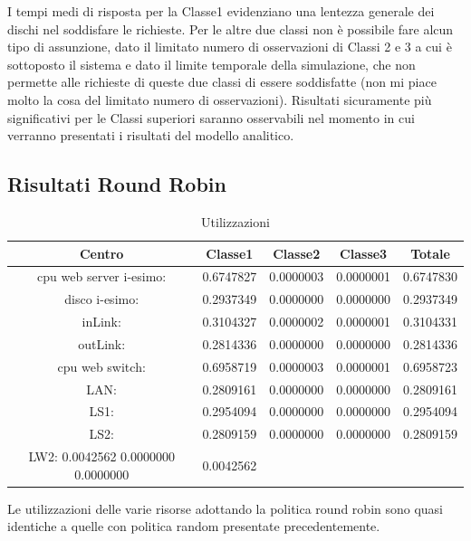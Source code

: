 I tempi medi di risposta per la Classe1 evidenziano una lentezza generale dei dischi nel soddisfare le richieste. Per le altre due classi non è possibile fare alcun tipo di assunzione, dato il limitato numero di osservazioni di Classi 2 e 3 a cui è sottoposto il sistema e dato il limite temporale della simulazione, che non permette alle richieste di queste due classi di essere soddisfatte (non mi piace molto la cosa del limitato numero di osservazioni). Risultati sicuramente più significativi per le Classi superiori saranno osservabili nel momento in cui verranno presentati i risultati del modello analitico.

\subsection{Risultati Round Robin}
\begin{table}[htbp]
\begin{center}
\begin{tabular}{|c|c|c|c|c|}
\hline
Centro &Classe1 &Classe2 &Classe3 &Totale\\
\hline
\hline
 cpu web server i-esimo: 	&0.6747827	&0.0000003	&0.0000001	&0.6747830\\
\hline
 disco i-esimo: 	&0.2937349	&0.0000000	&0.0000000	&0.2937349\\
\hline
 inLink: 	&0.3104327	&0.0000002	&0.0000001	&0.3104331\\
\hline
 outLink: 	&0.2814336	&0.0000000	&0.0000000	&0.2814336\\
\hline
 cpu web switch: 	&0.6958719	&0.0000003	&0.0000001	&0.6958723\\
\hline
 LAN: 	&0.2809161	&0.0000000	&0.0000000	&0.2809161\\
\hline
 LS1: 	&0.2954094	&0.0000000	&0.0000000	&0.2954094\\
\hline
 LS2:	&0.2809159	&0.0000000	&0.0000000	&0.2809159\\
\hline
 LW2: 	0.0042562	0.0000000	0.0000000	&0.0042562\\
\hline
\end{tabular}
\end{center}
\caption{Utilizzazioni}
\label{utilizzazioni}
\end{table}
Le utilizzazioni delle varie risorse adottando la politica round robin sono quasi identiche a quelle con politica random presentate precedentemente.
